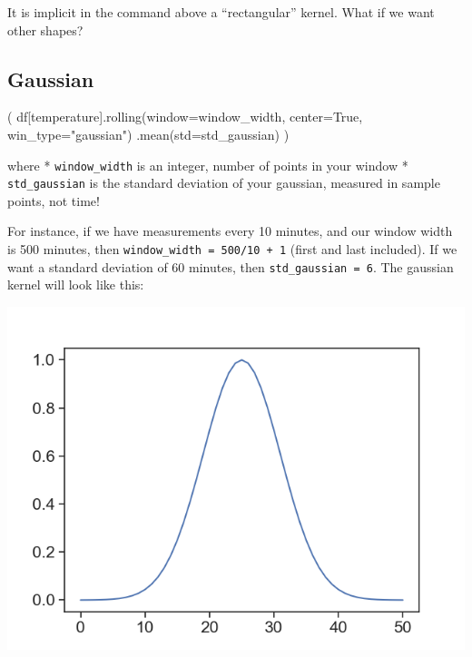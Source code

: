 \documentclass[
  letterpaper,
  DIV=11,
  numbers=noendperiod,
  oneside]{scrreprt}
\newenvironment{Shaded}{\begin{snugshade}}{\end{snugshade}}
\newcommand{\NormalTok}[1]{\textcolor[rgb]{0.00,0.23,0.31}{#1}}
\newcommand{\OperatorTok}[1]{\textcolor[rgb]{0.37,0.37,0.37}{#1}}
\newcommand{\StringTok}[1]{\textcolor[rgb]{0.13,0.47,0.30}{#1}}
\newcommand{\VariableTok}[1]{\textcolor[rgb]{0.07,0.07,0.07}{#1}}
\begin{document}
It is implicit in the command above a ``rectangular'' kernel. What if we
want other shapes?

\hypertarget{gaussian}{%
\subsection{Gaussian}\label{gaussian}}

\begin{Shaded}
\begin{Highlighting}[]
\NormalTok{(}
\NormalTok{df[}\StringTok{\textquotesingle{}temperature\textquotesingle{}}\NormalTok{].rolling(window}\OperatorTok{=}\NormalTok{window\_width,}
\NormalTok{                          center}\OperatorTok{=}\VariableTok{True}\NormalTok{,}
\NormalTok{                          win\_type}\OperatorTok{=}\StringTok{"gaussian"}\NormalTok{)}
\NormalTok{                 .mean(std}\OperatorTok{=}\NormalTok{std\_gaussian)}
\NormalTok{)}
\end{Highlighting}
\end{Shaded}

where * \texttt{window\_width} is an integer, number of points in your
window * \texttt{std\_gaussian} is the standard deviation of your
gaussian, measured in sample points, not time!

For instance, if we have measurements every 10 minutes, and our window
width is 500 minutes, then \texttt{window\_width\ =\ 500/10\ +\ 1}
(first and last included). If we want a standard deviation of 60
minutes, then \texttt{std\_gaussian\ =\ 6}. The gaussian kernel will
look like this:

\includegraphics{smoothing/gaussian_kernel.png}
\end{document}

